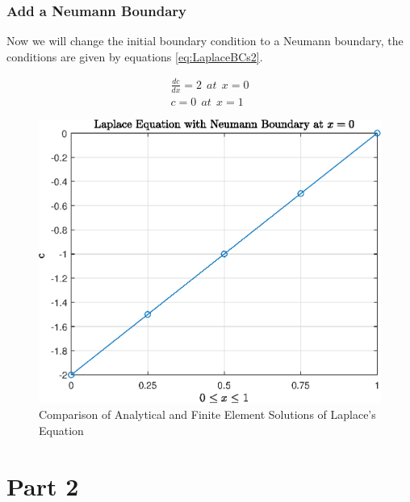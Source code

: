 \documentclass[11pt]{article}
\begin{document}
\subsubsection{Add a Neumann Boundary}
Now we will change the initial boundary condition to a Neumann boundary, the conditions are given by equations \ref{eq:LaplaceBCs2}.

\begin{subequations}\label{eq:LaplaceBCs2}
\begin{align}
\frac{dc}{dx} = 2 \ \ at \ \ x = 0 \\
c = 0 \ \ at \ \  x= 1
\end{align}
\end{subequations}

\begin{figure}[h!] \label{fig:LaplaceFig2}
    \centering
    \includegraphics{epsLaplaceFig2}
    \caption{Comparison of Analytical and Finite Element Solutions of Laplace's Equation}
\end{figure}

\section{Part 2}



\pagebreak



%
\end{document}
